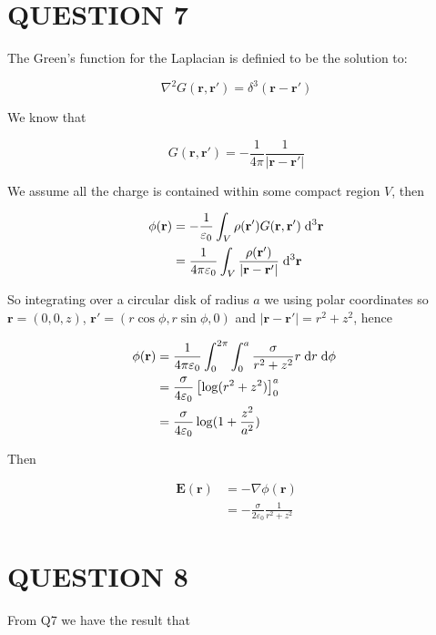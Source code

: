 \documentclass[a4paper]{article}
\begin{document}
\section{QUESTION 7}

The Green's function for the Laplacian is definied to be the solution to:

\[ \nabla^{2} G(\mathbf{r},\mathbf{r}') = \delta^{3} (\mathbf{r} - \mathbf{r}')  \]

We know that

\[ G(\mathbf{r},\mathbf{r}') = - \frac{1}{4 \pi} \frac{1}{| \mathbf{r} - \mathbf{r}' |}  \]

We assume all the charge is contained within some compact region $ V $, then

\begin{align*}
\phi(\mathbf{r}) & = - \frac{1}{\varepsilon_{0}} \int_{V} \rho(\mathbf{r}') G(\mathbf{r},\mathbf{r}') \; \mathrm{d}^{3} \mathbf{r} \\
& = \frac{1}{4 \pi \varepsilon_{0}} \int_{V} \frac{\rho(\mathbf{r}')}{| \mathbf{r} - \mathbf{r}' |} \; \mathrm{d}^{3} \mathbf{r}
\end{align*}

So integrating over a circular disk of radius $ a $ we using polar coordinates so $ \mathbf{r} = (0,0,z) $, $ \mathbf{r}' = (r \cos \phi, r \sin \phi,0) $ and $ | \mathbf{r} - \mathbf{r}' | = r^{2} + z^{2} $, hence

\begin{align*}
\phi(\mathbf{r}) & = \frac{1}{4 \pi \varepsilon_{0}} \int_{0}^{2\pi} \int_{0}^{a} \frac{\sigma}{r^{2} + z^{2}} r \; \mathrm{d} r \;  \mathrm{d} \phi  \ \\
& = \frac{\sigma}{4 \varepsilon_{0}} \left[  \log ( r^{2} + z^{2} ) \right]_{0}^{a} \\
& = \frac{\sigma}{4 \varepsilon_{0}} \log ( 1 + \frac{z^{2}}{a^{2}} ) 
\end{align*}

Then 

\begin{align*}
\mathbf{E}(\mathbf{r}) & = - \nabla  \phi (\mathbf{r}) \\
& = - \frac{\sigma}{2 \varepsilon_{0}} \frac{1}{r^{2} + z^{2}}
\end{align*}


\section{QUESTION 8}

From Q7 we have the result that
\end{document}
